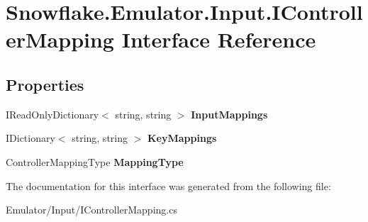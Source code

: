 \hypertarget{interface_snowflake_1_1_emulator_1_1_input_1_1_i_controller_mapping}{}\section{Snowflake.\+Emulator.\+Input.\+I\+Controller\+Mapping Interface Reference}
\label{interface_snowflake_1_1_emulator_1_1_input_1_1_i_controller_mapping}
\subsection*{Properties}
\begin{DoxyCompactItemize}
\item 
\hypertarget{interface_snowflake_1_1_emulator_1_1_input_1_1_i_controller_mapping_a40b34b1bdc4177d0c42cc2045eb4689d}{}I\+Read\+Only\+Dictionary$<$ string, string $>$ {\bfseries Input\+Mappings}\label{interface_snowflake_1_1_emulator_1_1_input_1_1_i_controller_mapping_a40b34b1bdc4177d0c42cc2045eb4689d}

\item 
\hypertarget{interface_snowflake_1_1_emulator_1_1_input_1_1_i_controller_mapping_a3c1f4a854d1f2f791e048bd3267ad886}{}I\+Dictionary$<$ string, string $>$ {\bfseries Key\+Mappings}\label{interface_snowflake_1_1_emulator_1_1_input_1_1_i_controller_mapping_a3c1f4a854d1f2f791e048bd3267ad886}

\item 
\hypertarget{interface_snowflake_1_1_emulator_1_1_input_1_1_i_controller_mapping_a807b8f8a9374cd7b4841ab156fcf051b}{}Controller\+Mapping\+Type {\bfseries Mapping\+Type}\label{interface_snowflake_1_1_emulator_1_1_input_1_1_i_controller_mapping_a807b8f8a9374cd7b4841ab156fcf051b}

\end{DoxyCompactItemize}


The documentation for this interface was generated from the following file\+:\begin{DoxyCompactItemize}
\item 
Emulator/\+Input/I\+Controller\+Mapping.\+cs\end{DoxyCompactItemize}
